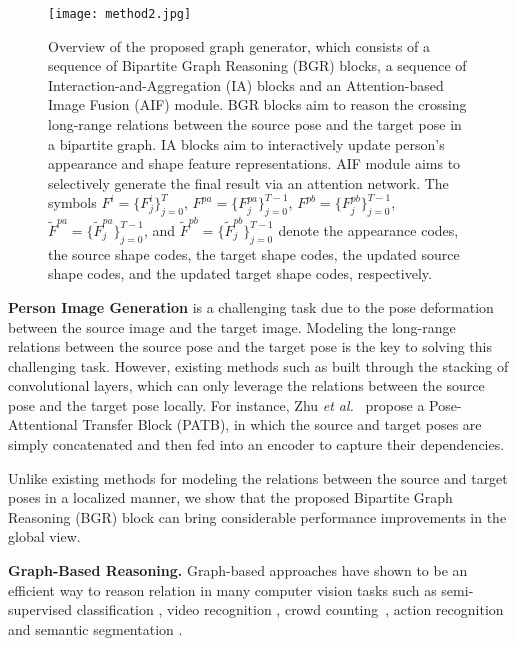 \documentclass{bmvc2k}
\begin{document}
\begin{figure}[!t]
	\centering
\texttt{[image: method2.jpg]}
	\caption{Overview of the proposed graph generator, which consists of a sequence of Bipartite Graph Reasoning (BGR) blocks, a sequence of Interaction-and-Aggregation (IA) blocks and an Attention-based Image Fusion (AIF) module. BGR blocks aim to reason the crossing long-range relations between the source pose and the target pose in a bipartite graph. IA blocks aim to interactively update person's appearance and shape feature representations. AIF module aims to selectively generate the final result via an attention network.
	The symbols $F^i{=}\{F^i_j\}_{j=0}^T$, $F^{pa}{=}\{F^{pa}_j\}_{j=0}^{T{-}1}$, $F^{pb}{=}\{F^{pb}_j\}_{j=0}^{T{-}1}$, $\tilde{F}^{pa}{=}\{\tilde{F}^{pa}_j\}_{j=0}^{T{-}1}$, and $\tilde{F}^{pb}{=}\{\tilde{F}^{pb}_j\}_{j=0}^{T{-}1}$ denote the appearance codes, the source shape codes, the target shape codes, the updated source shape codes, and the updated target shape codes, respectively.
	}
	\label{fig:method}
\end{figure}

\noindent \textbf{Person Image Generation} is a challenging task due to the pose deformation between the source image and the target image.
Modeling the long-range relations between the source pose and the target pose is the key to solving this challenging task.
However, existing methods such as \cite{ma2017pose,ma2018disentangled,balakrishnan2018synthesizing,siarohin2018deformable,tang2019cycle,albahar2019guided,esser2018variational,zhu2019progressive,chan2019everybody,zanfir2018human,liang2019pcgan,liu2019liquid} built through the stacking of convolutional layers, which can only leverage the relations between the source pose and the target pose locally.
For instance, Zhu \emph{et al.}~\cite{zhu2019progressive} propose a Pose-Attentional Transfer Block (PATB), in which the source and target poses are simply concatenated and then fed into an encoder to capture their dependencies.

Unlike existing methods for modeling the relations between the source and target poses in a localized manner, we show that the proposed Bipartite Graph Reasoning (BGR) block can bring considerable performance improvements in the global view.

\noindent \textbf{Graph-Based Reasoning.} Graph-based approaches have shown to be an efficient way to reason relation in many computer vision tasks such as semi-supervised classification \cite{kipf2017semi}, video recognition \cite{wang2018videos}, crowd counting~\cite{chen2020relevant}, action recognition \cite{yan2018spatial,peng2020mix} and semantic segmentation \cite{chen2019graph,zhang2019dual}.
\end{document}
